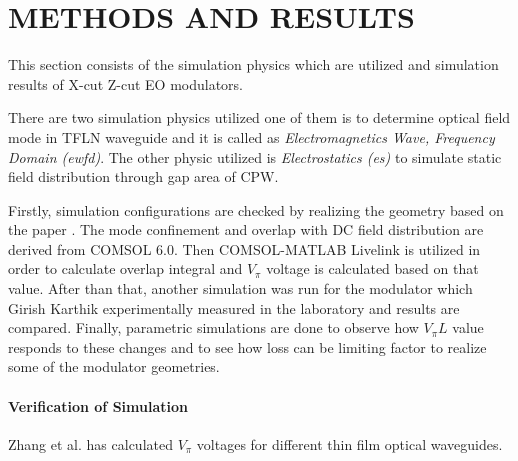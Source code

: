 
\chapter{METHODS AND RESULTS}

    This section consists of the simulation physics which are utilized and simulation results of X-cut  Z-cut EO modulators.
    
    There are  two simulation physics utilized one of them is to determine optical field mode in TFLN waveguide and it is called as \textit{Electromagnetics Wave, Frequency Domain (ewfd)}. The other physic utilized is \textit{Electrostatics (es)} to simulate static field distribution through gap area of CPW. 
    
    Firstly, simulation configurations are checked by realizing the geometry based on the paper \cite{21}.  The mode confinement and overlap with DC field distribution are derived from COMSOL 6.0. Then COMSOL-MATLAB Livelink is utilized in order to calculate overlap integral and $V_\pi$ voltage is calculated based on that value. After than that, another simulation was run for the modulator which Girish Karthik experimentally measured in the laboratory and results are compared. Finally, parametric simulations are done to observe how $V_\pi L$ value responds to these changes and to see how loss can be limiting factor to realize some of the modulator geometries. 


    \subsubsection{Verification of Simulation}

    Zhang et al. \cite{21} has calculated $V_\pi$ voltages for different thin film optical waveguides.  



